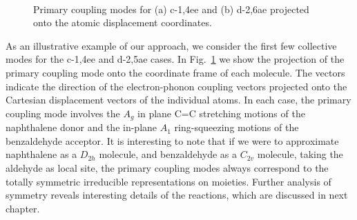 \begin{figure}[t]
\\
\caption{
Primary coupling modes for (a) c-1,4ee and (b) d-2,6ae projected onto the atomic displacement coordinates.
}\label{LanczosModes_chap2}
\end{figure}


As an illustrative example of our approach, we consider the
first few collective modes for the c-1,4ee and d-2,5ae cases.
 In Fig.~\ref{LanczosModes_chap2}
we show the projection of the primary coupling mode onto the
coordinate frame of each molecule.  The vectors indicate the direction
of the electron-phonon coupling vectors projected onto the Cartesian displacement
vectors of the individual atoms.   In each case, the primary
coupling mode involves the  $A_{g}$ in plane C=C stretching motions of the naphthalene donor and the
 in-plane $A_1$ ring-squeezing motions of the benzaldehyde acceptor.
It is interesting to note that
if we were to approximate naphthalene as a $D_{2h}$ molecule, and benzaldehyde as a $C_{2v}$ molecule, taking the aldehyde as local site, the primary coupling modes always correspond to the totally symmetric irreducible representations on moieties. Further analysis of symmetry reveals interesting details of the reactions, which are discussed in next chapter.


